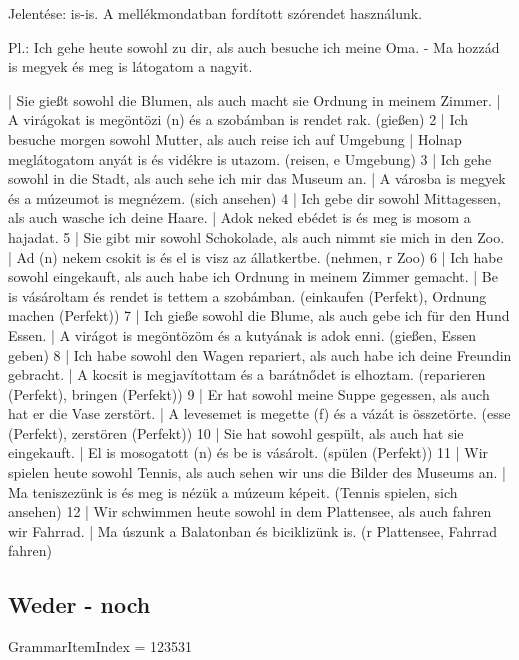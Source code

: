 \documentclass{article}
\newenvironment{desc}{\verbatim}{\endverbatim}
\newenvironment{exmp}{\verbatim}{\endverbatim}
\begin{document}
\begin{desc}
Jelentése: is-is.
A mellékmondatban fordított szórendet használunk.

Pl.: Ich gehe heute sowohl zu dir, als auch besuche ich meine Oma. - Ma hozzád is megyek és meg is látogatom a nagyit. 
\end{desc}

\begin{exmp}
1 | Sie gießt sowohl die Blumen, als auch macht sie Ordnung in meinem Zimmer. | A virágokat is megöntözi (n) és a szobámban is rendet rak. (gießen)
2 | Ich besuche morgen sowohl Mutter, als auch reise ich auf Umgebung | Holnap meglátogatom anyát is és vidékre is utazom. (reisen, e Umgebung)
3 | Ich gehe sowohl in die Stadt, als auch sehe ich mir das Museum an. | A városba is megyek és a múzeumot is megnézem. (sich ansehen)
4 | Ich gebe dir sowohl Mittagessen, als auch wasche ich deine Haare. | Adok neked ebédet is és meg is mosom a hajadat.
5 | Sie gibt mir sowohl Schokolade, als auch nimmt sie mich in den Zoo. | Ad (n) nekem csokit is és el is visz az állatkertbe. (nehmen, r Zoo)
6 | Ich habe sowohl eingekauft, als auch habe ich Ordnung in meinem Zimmer gemacht. | Be is vásároltam és rendet is tettem a szobámban. (einkaufen (Perfekt), Ordnung machen (Perfekt))
7 | Ich gieße sowohl die Blume, als auch gebe ich für den Hund Essen. | A virágot is megöntözöm és a kutyának is adok enni. (gießen, Essen geben)
8 | Ich habe sowohl den Wagen repariert, als auch habe ich deine Freundin gebracht. | A kocsit is megjavítottam és a barátnődet is elhoztam. (reparieren (Perfekt), bringen (Perfekt))
9 | Er hat sowohl meine Suppe gegessen, als auch hat er die Vase zerstört. | A levesemet is megette (f) és a vázát is összetörte. (esse (Perfekt), zerstören (Perfekt))
10 | Sie hat sowohl gespült, als auch hat sie eingekauft. | El is mosogatott (n) és be is vásárolt. (spülen (Perfekt))
11 | Wir spielen heute sowohl Tennis, als auch sehen wir uns die Bilder des Museums an. | Ma teniszezünk is és meg is nézük a múzeum képeit. (Tennis spielen, sich ansehen)
12 | Wir schwimmen heute sowohl in dem Plattensee, als auch fahren wir Fahrrad. | Ma úszunk a Balatonban és biciklizünk is. (r Plattensee, Fahrrad fahren)
\end{exmp}

\subsection{Weder - noch}

GrammarItemIndex = 123531
\end{document}
